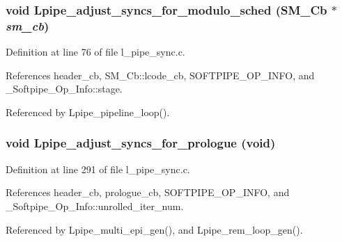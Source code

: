 \subsubsection{\setlength{\rightskip}{0pt plus 5cm}void Lpipe\_\-adjust\_\-syncs\_\-for\_\-modulo\_\-sched (\bf{SM\_\-Cb} $\ast$ {\em sm\_\-cb})}\label{l__pipe__sync_8c_0bef7d95bb30bcb052fb9d8064a32d58}




Definition at line 76 of file l\_\-pipe\_\-sync.c.

References header\_\-cb, SM\_\-Cb::lcode\_\-cb, SOFTPIPE\_\-OP\_\-INFO, and \_\-Softpipe\_\-Op\_\-Info::stage.

Referenced by Lpipe\_\-pipeline\_\-loop().
\subsubsection{\setlength{\rightskip}{0pt plus 5cm}void Lpipe\_\-adjust\_\-syncs\_\-for\_\-prologue (void)}\label{l__pipe__sync_8c_d9b8990e5b0abcad84d75eea67f9326e}




Definition at line 291 of file l\_\-pipe\_\-sync.c.

References header\_\-cb, prologue\_\-cb, SOFTPIPE\_\-OP\_\-INFO, and \_\-Softpipe\_\-Op\_\-Info::unrolled\_\-iter\_\-num.

Referenced by Lpipe\_\-multi\_\-epi\_\-gen(), and Lpipe\_\-rem\_\-loop\_\-gen().